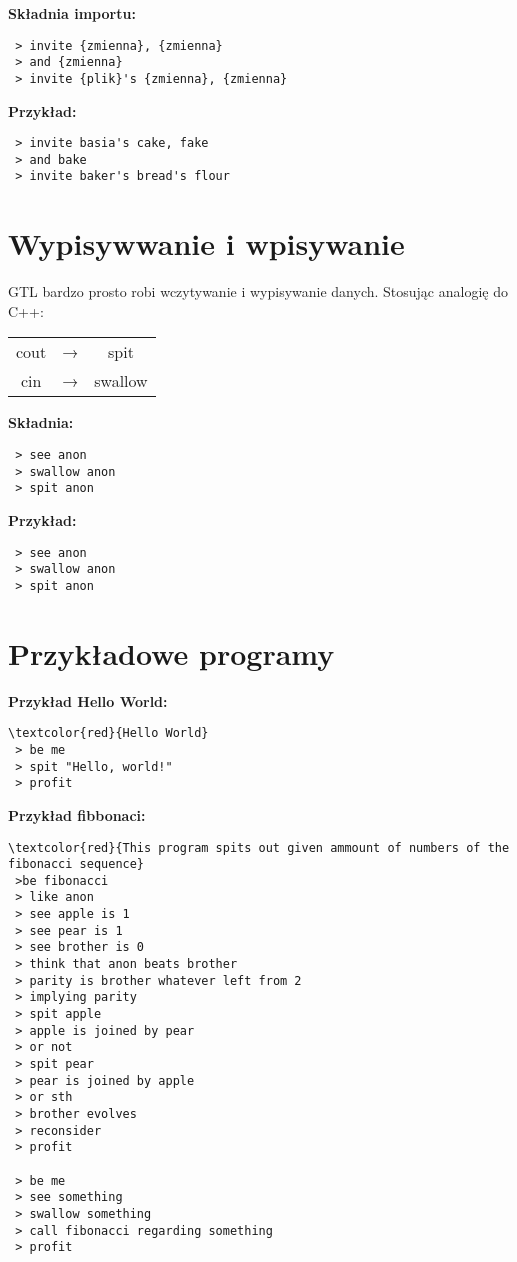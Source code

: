\documentclass{article}
\begin{document}
\textbf{Składnia importu:}
{ \color{green}
\begin{verbatim}
 > invite {zmienna}, {zmienna}
 > and {zmienna}
 > invite {plik}'s {zmienna}, {zmienna}
\end{verbatim}
}
\textbf{Przykład:}
{ \color{green}
\begin{verbatim}
 > invite basia's cake, fake
 > and bake
 > invite baker's bread's flour
\end{verbatim}
}

\section{Wypisywwanie i wpisywanie}

GTL bardzo prosto robi wczytywanie i wypisywanie danych. Stosując analogię do C++:

\begin{table}[H]
\centering
\begin{tabular}{ccc}
cout          & → & spit   \\
cin           & → & swallow
\end{tabular}
\end{table}

\textbf{Składnia:}
{ \color{green}
\begin{verbatim}
 > see anon
 > swallow anon
 > spit anon
\end{verbatim}
}

\textbf{Przykład:}
{ \color{green}
\begin{verbatim}
 > see anon
 > swallow anon
 > spit anon
\end{verbatim}
}

\newpage

\section{Przykładowe programy}

\textbf{Przykład Hello World:}
{\color{green}
\begin{Verbatim}[commandchars=\\\{\}]
\textcolor{red}{Hello World}
 > be me
 > spit "Hello, world!"
 > profit
\end{Verbatim}
}

\textbf{Przykład fibbonaci:}
{\color{green}
\begin{Verbatim}[commandchars=\\\{\}]
\textcolor{red}{This program spits out given ammount of numbers of the fibonacci sequence}
 >be fibonacci
 > like anon
 > see apple is 1
 > see pear is 1
 > see brother is 0
 > think that anon beats brother
 > parity is brother whatever left from 2
 > implying parity
 > spit apple
 > apple is joined by pear
 > or not
 > spit pear
 > pear is joined by apple
 > or sth
 > brother evolves
 > reconsider
 > profit

 > be me
 > see something
 > swallow something
 > call fibonacci regarding something
 > profit
\end{Verbatim}
}
\end{document}
